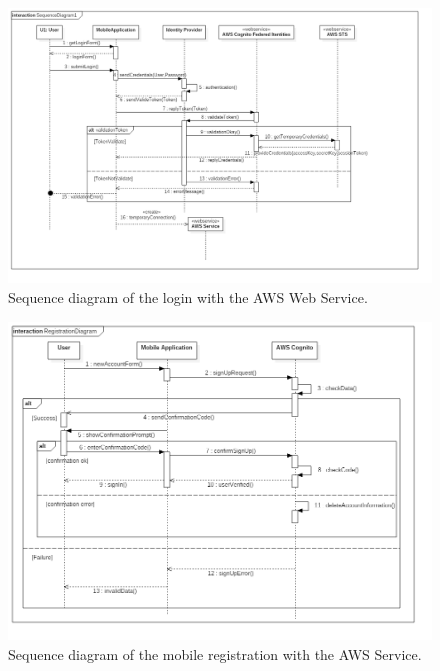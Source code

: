 \begin{figure}
	\centering
	\includegraphics[width=6in]{./diagrams/SequenceDiagramLogin.png}
	\caption{Sequence diagram of the login with the AWS Web Service.}
	\label{fig:seqLogin}
\end{figure}

\begin{figure}
	\centering
	\includegraphics[width=6in]{./diagrams/RegistrationDiagram.png}
	\caption{Sequence diagram of the mobile registration with the AWS Service.}
	\label{fig:seqRegistration}
\end{figure}

